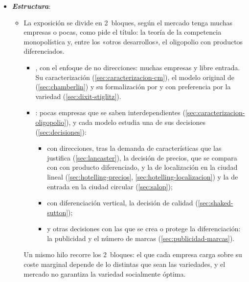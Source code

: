 \documentclass[11pt]{article}
\begin{document}
\begin{itemize}
\item \textbf{\emph{Estructura}}:
  \begin{itemize}
  \item La exposición se divide en 2~bloques, según el mercado tenga muchas empresas o pocas, como pide el título: la teoría de la competencia monopolística y, entre los «otros desarrollos», el oligopolio con productos diferenciados.
  \begin{itemize}
  \item {}, con el enfoque de no direcciones: muchas empresas y libre entrada. Su caracterización (\ref{sec:caracterizacion-cm}), el modelo original de  (\ref{sec:chamberlin}) y su formalización por  y  con preferencia por la variedad (\ref{sec:dixit-stiglitz}).
  \item {}: pocas empresas que se saben interdependientes (\ref{sec:caracterizacion-oligopolio}), y cada modelo estudia una de sus decisiones (\ref{sec:decisiones}):
    \begin{itemize}
    \item con direcciones, tras la demanda de características que las justifica (\ref{sec:lancaster}), la decisión de precios, que se compara con  con producto diferenciado, y la de localización en la ciudad lineal (\ref{sec:hotelling-precios}, \ref{sec:hotelling-localizacion}) y la de entrada en la ciudad circular (\ref{sec:salop});
    \item con diferenciación vertical, la decisión de calidad (\ref{sec:shaked-sutton});
    \item y otras decisiones con las que se crea o protege la diferenciación: la publicidad y el número de marcas (\ref{sec:publicidad-marcas}).
    \end{itemize}
  \end{itemize}
  Un mismo hilo recorre los 2~bloques: el  que cada empresa carga sobre su coste marginal depende de lo distintas que sean las variedades, y el mercado no garantiza la variedad socialmente óptima.
  \end{itemize}
\end{itemize}
\end{document}
